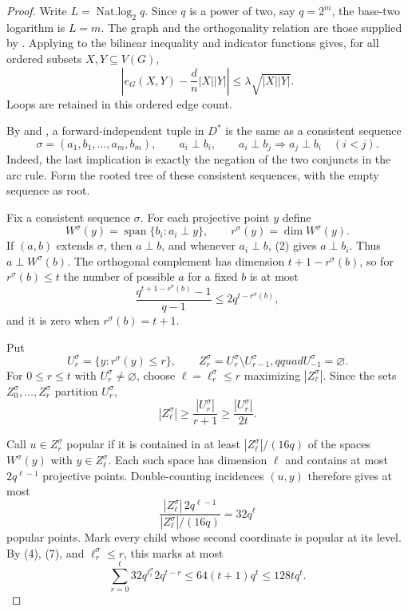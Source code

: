 \begin{proof}
Write $L=\operatorname{Nat.log}_2q$.  Since $q$ is a power of two, say
$q=2^m$, the base-two logarithm is $L=m$.  The graph and the orthogonality
relation are those supplied by .  Applying
 to the bilinear inequality and indicator functions
gives, for all ordered subsets $X,Y\subseteq V(G)$,
\[
 \left|e_G(X,Y)-\frac dn|X||Y|\right|
 \leq\lambda\sqrt{|X||Y|}.                                  \tag{1}
\]
Loops are retained in this ordered edge count.

By  and
, a forward-independent tuple in $D^*$ is
the same as a consistent sequence
\[
 \sigma=(a_1,b_1,\ldots,a_m,b_m),\qquad
 a_i\perp b_i,\qquad
 a_i\perp b_j\Longrightarrow a_j\perp b_i\quad(i<j).       \tag{2}
\]
Indeed, the last implication is exactly the negation of the two conjuncts in
the arc rule.  Form the rooted tree of these consistent sequences, with the
empty sequence as root.

Fix a consistent sequence $\sigma$.  For each projective point $y$ define
\[
 W^\sigma(y)=\operatorname{span}\{b_i:a_i\perp y\},
 \qquad r^\sigma(y)=\dim W^\sigma(y).                       \tag{3}
\]
If $(a,b)$ extends $\sigma$, then $a\perp b$, and whenever $a_i\perp b$,
(2) gives $a\perp b_i$.  Thus $a\perp W^\sigma(b)$.  The orthogonal
complement has dimension $t+1-r^\sigma(b)$, so for $r^\sigma(b)\leq t$ the
number of possible $a$ for a fixed $b$ is at most
\[
 \frac{q^{t+1-r^\sigma(b)}-1}{q-1}\leq2q^{t-r^\sigma(b)},  \tag{4}
\]
and it is zero when $r^\sigma(b)=t+1$.

Put
\[
 U_r^\sigma=\{y:r^\sigma(y)\leq r\},\qquad
 Z_r^\sigma=U_r^\sigma\setminus U_{r-1}^\sigma,qquad U_{-1}^\sigma=\varnothing.
                                                                    \tag{5}
\]
For $0\leq r\leq t$ with $U_r^\sigma\ne\varnothing$, choose
$\ell=\ell_r^\sigma\leq r$ maximizing $|Z_\ell^\sigma|$.  Since the sets
$Z_0^\sigma,\ldots,Z_r^\sigma$ partition $U_r^\sigma$,
\[
 |Z_\ell^\sigma|\geq\frac{|U_r^\sigma|}{r+1}
 \geq\frac{|U_r^\sigma|}{2t}.                                \tag{6}
\]

Call $u\in Z_r^\sigma$ popular if it is contained in at least
$|Z_\ell^\sigma|/(16q)$ of the spaces $W^\sigma(y)$ with
$y\in Z_\ell^\sigma$.  Each such space has dimension $\ell$ and contains at
most $2q^{\ell-1}$ projective points.  Double-counting incidences $(u,y)$
therefore gives at most
\[
 \frac{|Z_\ell^\sigma|\,2q^{\ell-1}}
 {|Z_\ell^\sigma|/(16q)}=32q^\ell                       \tag{7}
\]
popular points.  Mark every child whose second coordinate is popular at its
level.  By (4), (7), and $\ell_r^\sigma\leq r$, this marks at most
\[
 \sum_{r=0}^t32q^{\ell_r^\sigma}2q^{t-r}
 \leq64(t+1)q^t\leq128tq^t.                                \tag{8}
\]


\end{proof}
